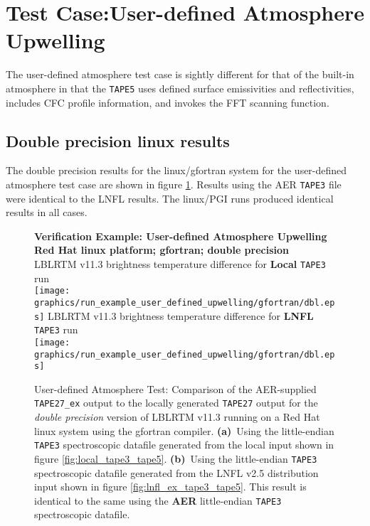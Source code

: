 \section{Test Case:User-defined Atmosphere Upwelling}

The user-defined atmosphere test case is sightly different for that of the built-in atmosphere in that the \texttt{TAPE5} uses defined surface emissivities and reflectivities, includes CFC profile information, and invokes the FFT scanning function.

\subsection{Double precision linux results}
The double precision results for the linux/gfortran system for the user-defined atmosphere test case are shown in figure \ref{fig:run_example_user_defined_upwelling-dbl_gfortran}. Results using the AER \texttt{TAPE3} file were identical to the LNFL results. The linux/PGI runs produced identical results in all cases.

\begin{figure}[htp]
  \centering
  \qquad\sffamily\textbf{Verification Example: User-defined Atmosphere Upwelling}\\
  \qquad\sffamily\textbf{Red Hat linux platform; gfortran; double precision}\\
  \qquad\textsf{LBLRTM v11.3 brightness temperature difference for \textbf{Local} \texttt{TAPE3} run}\\
  \texttt{[image: graphics/run\_example\_user\_defined\_upwelling/gfortran/dbl.eps]}
  \qquad\textsf{LBLRTM v11.3 brightness temperature difference for \textbf{LNFL} \texttt{TAPE3} run}\\
  \texttt{[image: graphics/run\_example\_user\_defined\_upwelling/gfortran/dbl.eps]}
  \caption{User-defined Atmosphere Test: Comparison of the AER-supplied \texttt{TAPE27\_ex} output to the locally generated \texttt{TAPE27} output for the \textsl{double precision} version of LBLRTM v11.3 running on a Red Hat linux system using the gfortran compiler. \mbox{\textbf{(a)} Using} the little-endian \texttt{TAPE3} spectroscopic datafile generated from the local input shown in figure \ref{fig:local_tape3_tape5}. \mbox{\textbf{(b)} Using} the little-endian \texttt{TAPE3} spectroscopic datafile generated from the LNFL v2.5 distribution input shown in figure \ref{fig:lnfl_ex_tape3_tape5}. This result is identical to the same using the \textbf{AER} little-endian \texttt{TAPE3} spectroscopic datafile.}
  \label{fig:run_example_user_defined_upwelling-dbl_gfortran}
\end{figure}

